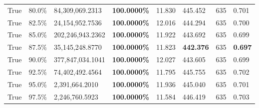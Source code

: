 \begin{table}[H]
\begin{tabular}{lllrllll}
\cline{1-8}
True & 80.0\% & 84,309,069.2313 & \bfseries \color{red} 100.0000\% & 11.830 & 445.452 & 635 & 0.701 \\
\cline{1-8}
True & 82.5\% & 24,154,952.7536 & \bfseries \color{red} 100.0000\% & 12.016 & 444.294 & 635 & 0.700 \\
\cline{1-8}
True & 85.0\% & 202,246,943.2362 & \bfseries \color{red} 100.0000\% & 11.922 & 443.692 & 635 & 0.699 \\
\cline{1-8}
True & 87.5\% & 35,145,248.8770 & \bfseries \color{red} 100.0000\% & 11.823 & \bfseries \color{red} 442.376 & 635 & \bfseries \color{red} 0.697 \\
\cline{1-8}
True & 90.0\% & 377,847,034.1041 & \bfseries \color{red} 100.0000\% & 12.027 & 443.605 & 635 & 0.699 \\
\cline{1-8}
True & 92.5\% & 74,402,492.4564 & \bfseries \color{red} 100.0000\% & 11.795 & 445.755 & 635 & 0.702 \\
\cline{1-8}
True & 95.0\% & 2,391,664.2010 & \bfseries \color{red} 100.0000\% & 11.936 & 445.040 & 635 & 0.701 \\
\cline{1-8}
True & 97.5\% & 2,246,760.5923 & \bfseries \color{red} 100.0000\% & 11.584 & 446.419 & 635 & 0.703 \\
\cline{1-8}
\bottomrule
\end{tabular}
\end{table}
